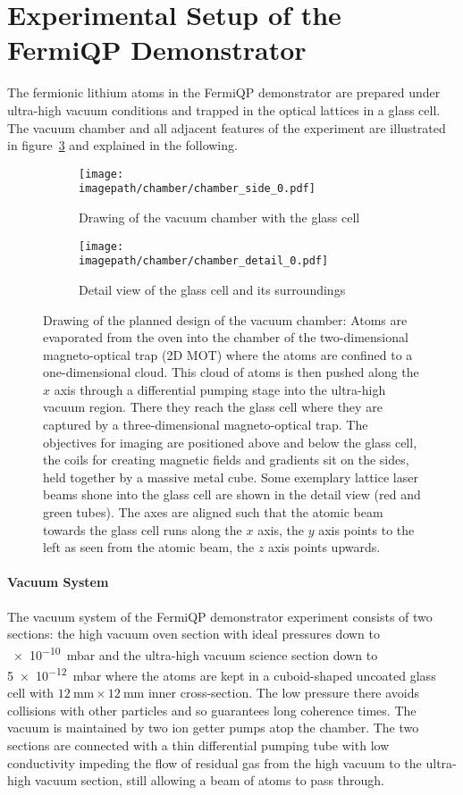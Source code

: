 \section{Experimental Setup of the FermiQP Demonstrator}
The fermionic lithium atoms in the FermiQP demonstrator are prepared under ultra-high vacuum conditions and trapped in the optical lattices in a glass cell. The vacuum chamber and all adjacent features of the experiment are illustrated in figure~\ref{fig:chamber} and explained in the following.

\begin{figure}
    \centering
    \begin{subfigure}[t]{0.64\textwidth}
        \centering
        \texttt{[image: \\imagepath/chamber/chamber\_side\_0.pdf]}
        \caption{Drawing of the vacuum chamber with the glass cell}
        \label{fig:chamber_coarse}
    \end{subfigure}
    \begin{subfigure}[t]{0.34\textwidth}
        \centering
        \texttt{[image: \\imagepath/chamber/chamber\_detail\_0.pdf]}
        \caption{Detail view of the glass cell and its surroundings}
        \label{fig:chamber_detail}
    \end{subfigure}
    \caption{Drawing of the planned design of the vacuum chamber: Atoms are evaporated from the oven into the chamber of the two-dimensional magneto-optical trap (2D MOT) where the atoms are confined to a one-dimensional cloud. This cloud of atoms is then pushed along the $x$ axis through a differential pumping stage into the ultra-high vacuum region. There they reach the glass cell where they are captured by a three-dimensional magneto-optical trap. The objectives for imaging are positioned above and below the glass cell, the coils for creating magnetic fields and gradients sit on the sides, held together by a massive metal cube. Some exemplary lattice laser beams shone into the glass cell are shown in the detail view (red and green tubes). The axes are aligned such that the atomic beam towards the glass cell runs along the $x$ axis, the $y$ axis points to the left as seen from the atomic beam, the $z$ axis points upwards.}  
    \label{fig:chamber}
\end{figure}

\paragraph{Vacuum System}
The vacuum system of the FermiQP demonstrator experiment consists of two sections: the high vacuum oven section with ideal pressures down to \SI[]{e-10}{\milli\bar} and the ultra-high vacuum science section down to \SI[]{5e-12}{\milli\bar} where the atoms are kept in a cuboid-shaped uncoated glass cell  with $\SI[]{12}{\milli\meter} \times \SI[]{12}{\milli\meter}$ inner cross-section. The low pressure there avoids collisions with other particles and so guarantees long coherence times. The vacuum is maintained by two ion getter pumps atop the chamber. The two sections are connected with a thin differential pumping tube with low conductivity impeding the flow of residual gas from the high vacuum to the ultra-high vacuum section, still allowing a beam of atoms to pass through.

